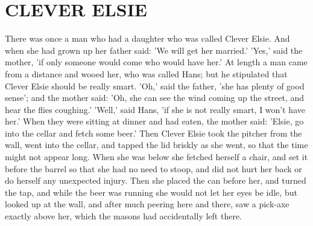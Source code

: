 \documentclass[12pt]{book}
\begin{document}
\chapter{CLEVER ELSIE}

There was once a man who had a daughter who was called Clever Elsie.
And when she had grown up her father said: 'We will get her married.'
'Yes,' said the mother, 'if only someone would come who would have
her.' At length a man came from a distance and wooed her, who was
called Hans; but he stipulated that Clever Elsie should be really
smart. 'Oh,' said the father, 'she has plenty of good sense'; and the
mother said: 'Oh, she can see the wind coming up the street, and hear
the flies coughing.' 'Well,' said Hans, 'if she is not really smart, I
won't have her.' When they were sitting at dinner and had eaten, the
mother said: 'Elsie, go into the cellar and fetch some beer.' Then
Clever Elsie took the pitcher from the wall, went into the cellar, and
tapped the lid briskly as she went, so that the time might not appear
long. When she was below she fetched herself a chair, and set it
before the barrel so that she had no need to stoop, and did not hurt
her back or do herself any unexpected injury. Then she placed the can
before her, and turned the tap, and while the beer was running she
would not let her eyes be idle, but looked up at the wall, and after
much peering here and there, saw a pick-axe exactly above her, which
the masons had accidentally left there.
\end{document}
